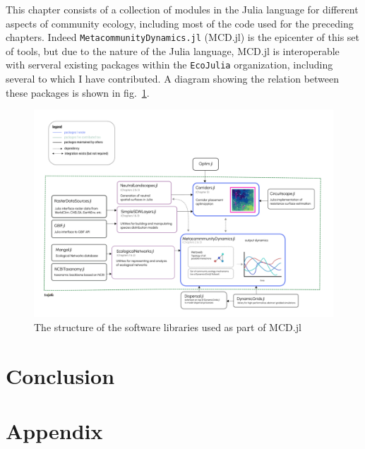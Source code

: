 \documentclass[10pt,oneside]{article}
\makeatletter
\def\maxwidth{\ifdim\Gin@nat@width>\linewidth\linewidth
\else\Gin@nat@width\fi}
\let\Oldincludegraphics\includegraphics
\renewcommand{\includegraphics}[1]{\Oldincludegraphics[width=\maxwidth]{#1}}
\makeatother
\begin{document}
This chapter consists of a collection of modules in the Julia language
for different aspects of community ecology, including most of the code
used for the preceding chapters. Indeed
\texttt{MetacommunityDynamics.jl} (MCD.jl) is the epicenter of this set
of tools, but due to the nature of the Julia language, MCD.jl is
interoperable with serveral existing packages within the
\texttt{EcoJulia} organization, including several to which I have
contributed. A diagram showing the relation between these packages is
shown in fig.~\ref{fig:software}.

\begin{figure}
\hypertarget{fig:software}{%
\centering
\includegraphics{./figures/ch4.png}
\caption{The structure of the software libraries used as part of
MCD.jl}\label{fig:software}
}
\end{figure}

\hypertarget{conclusion}{%
\section{Conclusion}\label{conclusion}}

\hypertarget{appendix}{%
\section{Appendix}\label{appendix}}
\end{document}
